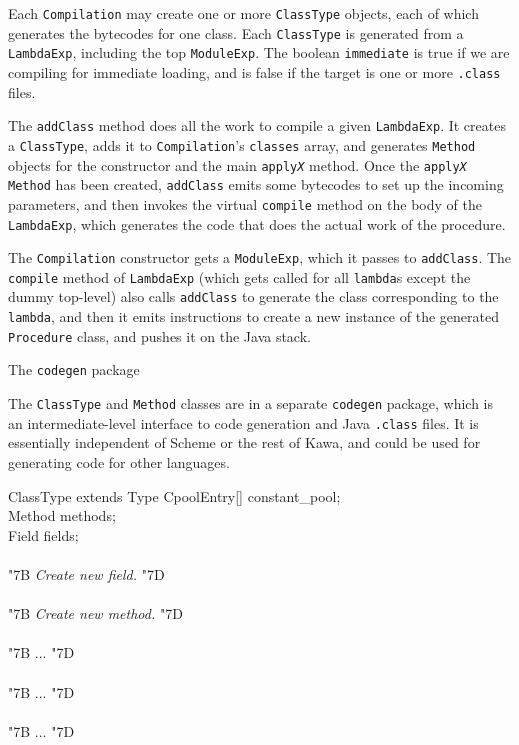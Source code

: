 \documentclass[twocolumn]{article}
\makeatletter
\def\section{\@startsection {section}{1}{\z@}
   {14pt plus 2pt minus 2pt}{12pt plus 2pt minus 2pt} {\large\bf}}
\newcommand{\LBr}{\char"7B}
\newcommand{\RBr}{\char"7D}
\makeatother
\begin{document}
Each {\tt Compilation} may create one or more {\tt ClassType}
objects, each of which generates
the bytecodes for one class.  Each {\tt ClassType} is generated
from a {\tt LambdaExp}, including the top {\tt ModuleExp}.
The boolean {\tt immediate} is true if we are compiling for immediate loading,
and is false if the target is one or more {\tt .class} files.

The {\tt addClass} method does all the work to
compile a given {\tt LambdaExp}.  It creates a {\tt ClassType},
adds it to {\tt Compilation}'s {\tt classes} array,
and generates {\tt Method} objects for the constructor and the main
{\tt apply{\it X}} method.  Once the {\tt apply{\it X}} {\tt Method}
has been created, {\tt addClass} emits some bytecodes to set up the
incoming parameters, and then invokes the virtual {\tt compile}
method on the body of the {\tt LambdaExp}, which generates
the code that does the actual work of the procedure.

The {\tt Compilation} constructor gets a {\tt ModuleExp},
which it passes to {\tt addClass}.  The {\tt compile}
method of {\tt LambdaExp} (which gets called for all {\tt lambda}s
except the dummy top-level) also calls {\tt addClass} to generate
the class corresponding to the {\tt lambda}, and then it emits
instructions to create a new instance of the generated {\tt Procedure} class,
and pushes it on the Java stack.

\section{The {\tt codegen} package}

The {\tt ClassType} and {\tt Method} classes are in a separate
{\tt codegen} package, which is an intermediate-level
interface to code generation and Java {\tt .class} files.
It is essentially independent of Scheme or the rest of Kawa,
and could be used for generating code for other languages.

\begin{Class}{ClassType}{ extends Type}
CpoolEntry[] constant\_pool;\\
Method methods; \\
Field fields; \\
\\
{\LBr} {\it Create new field.} {\RBr}\\
\\
{\LBr} {\it Create new method.} {\RBr}\\
\\
{\LBr} ... {\RBr}\\
\\
{\LBr} ... {\RBr}\\
\\
{\LBr} ... {\RBr}\\
\end{Class}
\end{document}
